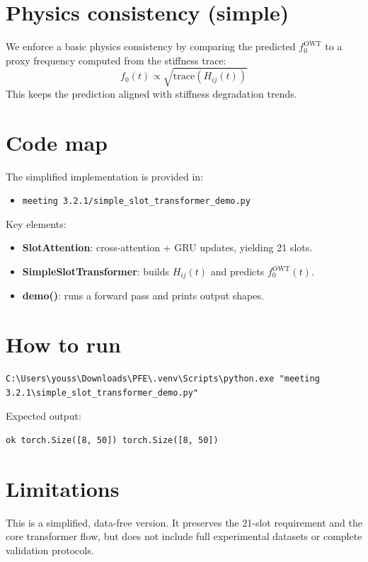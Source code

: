 \documentclass[11pt]{article}
\begin{document}
\section{Physics consistency (simple)}
We enforce a basic physics consistency by comparing the predicted $f_0^{\mathrm{OWT}}$ to a proxy
frequency computed from the stiffness trace:
\begin{equation}
  f_0(t) \propto \sqrt{\mathrm{trace}(H_{ij}(t))}
\end{equation}
This keeps the prediction aligned with stiffness degradation trends.

\section{Code map}
The simplified implementation is provided in:
\begin{itemize}
  \item \texttt{meeting 3.2.1/simple\_slot\_transformer\_demo.py}
\end{itemize}
Key elements:
\begin{itemize}
  \item \textbf{SlotAttention}: cross-attention + GRU updates, yielding 21 slots.
  \item \textbf{SimpleSlotTransformer}: builds $H_{ij}(t)$ and predicts $f_0^{\mathrm{OWT}}(t)$.
  \item \textbf{demo()}: runs a forward pass and prints output shapes.
\end{itemize}

\section{How to run}
\begin{verbatim}
C:\Users\youss\Downloads\PFE\.venv\Scripts\python.exe "meeting 3.2.1\simple_slot_transformer_demo.py"
\end{verbatim}
Expected output:
\begin{verbatim}
ok torch.Size([8, 50]) torch.Size([8, 50])
\end{verbatim}

\section{Limitations}
This is a simplified, data-free version. It preserves the 21-slot requirement and the
core transformer flow, but does not include full experimental datasets or complete
validation protocols.
\end{document}
